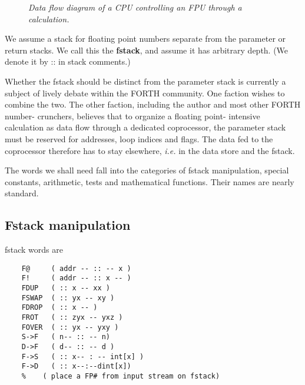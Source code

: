 \begin{figure}[H]
    \caption{\textit{Data flow diagram of a CPU controlling an FPU through a calculation.}}
    \label{fig:03_01}
\end{figure}

We assume a stack for floating point numbers separate from the 
parameter or return stacks. We call this the \textbf{fstack}, and assume it
has arbitrary depth. (We denote it by :: in stack comments.)

\leftbar[1\linewidth] \noindent
Whether the fstack should be distinct from the parameter stack is currently a subject of lively debate within the FORTH community. One faction wishes to combine the two. The other faction, including the author and most other FORTH number- crunchers, believes that to organize a floating point- intensive calculation as data flow through a dedicated coprocessor, the parameter stack must be reserved for addresses, loop indices and flags. The data fed to the coprocessor therefore has to stay elsewhere, \textit{i.e.} in the data store and the fstack.\endleftbar

The words we shall need fall into the categories of fstack manipulation, special constants, arithmetic, tests and mathematical functions. Their names are nearly standard.

\subsection{Fstack manipulation}
 fstack words are
\begin{lstlisting}
    F@     ( addr -- :: -- x )
    F!     ( addr -- :: x -- )
    FDUP   ( :: x -- xx )
    FSWAP  ( :: yx -- xy )
    FDROP  ( :: x -- )
    FROT   ( :: zyx -- yxz )
    FOVER  ( :: yx -- yxy )
    S->F   ( n-- :: -- n)
    D->F   ( d-- :: -- d )
    F->S   ( :: x-- : -- int[x] )
    F->D   ( :: x--:--dint[x])
    %    ( place a FP# from input stream on fstack)
\end{lstlisting}
 

